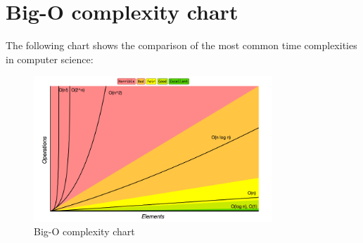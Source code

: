 \section{Big-O complexity chart}

The following chart shows the comparison of the most common time complexities in
computer science:

\begin{figure}[H]
    \centering
    \includegraphics[width=0.8\textwidth]{figures/image_big-o.png}
    \caption{Big-O complexity chart}
    \label{fig:big-o}
\end{figure}

